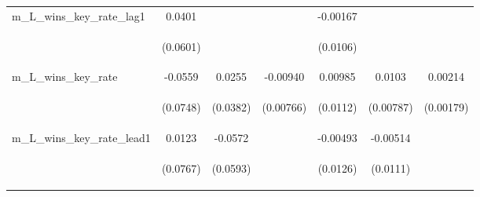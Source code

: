 \documentclass[]{article}
\begin{document}
\begin{center}
\begin{tabular}{lcccccc}
m\_L\_wins\_key\_rate\_lag1 & 0.0401 &  &  & -0.00167 &  &  \\
\vspace{4pt} & \begin{footnotesize}(0.0601)\end{footnotesize} & \begin{footnotesize}\end{footnotesize} & \begin{footnotesize}\end{footnotesize} & \begin{footnotesize}(0.0106)\end{footnotesize} & \begin{footnotesize}\end{footnotesize} & \begin{footnotesize}\end{footnotesize} \\
m\_L\_wins\_key\_rate & -0.0559 & 0.0255 & -0.00940 & 0.00985 & 0.0103 & 0.00214 \\
\vspace{4pt} & \begin{footnotesize}(0.0748)\end{footnotesize} & \begin{footnotesize}(0.0382)\end{footnotesize} & \begin{footnotesize}(0.00766)\end{footnotesize} & \begin{footnotesize}(0.0112)\end{footnotesize} & \begin{footnotesize}(0.00787)\end{footnotesize} & \begin{footnotesize}(0.00179)\end{footnotesize} \\
m\_L\_wins\_key\_rate\_lead1 & 0.0123 & -0.0572 &  & -0.00493 & -0.00514 &  \\
\vspace{4pt} & \begin{footnotesize}(0.0767)\end{footnotesize} & \begin{footnotesize}(0.0593)\end{footnotesize} & \begin{footnotesize}\end{footnotesize} & \begin{footnotesize}(0.0126)\end{footnotesize} & \begin{footnotesize}(0.0111)\end{footnotesize} & \begin{footnotesize}\end{footnotesize} \\

\end{tabular}
\end{center}
\end{document}
